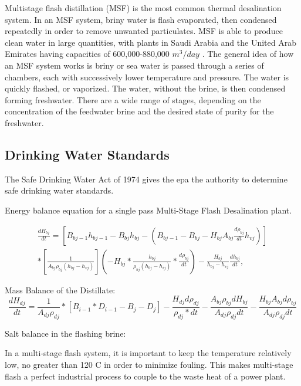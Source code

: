 \documentclass[12pt]{UIdahoMastersThesis}
\begin{document}
Multistage flash distillation (MSF) is the most common thermal desalination system. In an MSF system, briny water is flash evaporated, then condensed repeatedly in order to remove unwanted particulates. MSF is able to produce clean water in large quantities, with plants in Saudi Arabia and the United Arab Emirates having capacities of 600,000-880,000 $m^3/day$ \cite{El-Dessouky2016}. The general idea of how an MSF system works is briny or sea water is passed through a series of chambers, each with successively lower temperature and pressure.  The water is quickly flashed, or vaporized.  The water, without the brine, is then condensed forming freshwater.  There are a wide range of stages, depending on the concentration of the feedwater brine and the desired state of purity for the freshwater.


\subsection{Drinking Water Standards}
The Safe Drinking Water Act of 1974 gives the \ac{epa} the authority to determine safe drinking water standards.

Energy balance equation for a single pass Multi-Stage Flash Desalination plant.

\begin{equation*}
\begin{aligned}
\frac{dH_{bj}}{dt}=[B_{bj-1}h_{bj-1}-B_{bj}h_{bj}-(B_{bj-1}-B_{bj}-H_{bj}A_{bj}\frac{d\rho_{bj}}{dt}h_{vj})]\\
*[\frac{1}{A_{bj}\rho_{bj}(h_{bj}-h_{vj})}] (-H_{bj}*\frac{h_{bj}}{\rho_{bj}(h_{bj}-h_{ij})}*\frac{d\rho_{bj}}{dt})-\frac{H_{bj}}{h_{bj}-h_{vj}}\frac{dh_{bj}}{dt},
\end{aligned}
\end{equation*}

Mass Balance of the Distillate:
\begin{equation*}
\frac{dH_{dj}}{dt}=\frac{1}{A_{dj}{\rho_{dj}}}*[B_{i-1}*D_{i-1}-B_j-D_j]-\frac{H_{dj}d\rho_{dj}}{\rho_{dj}*dt}-\frac{A_{bj}\rho_{bj}dH_{bj}}{A_{dj}\rho_{dj}dt}-\frac{H_{bj}A_{bj}d\rho_{bj}}{A_{dj}\rho_{dj}dt}
\end{equation*}

Salt balance in the flashing brine:

In a multi-stage flash system, it is important to keep the temperature relatively low, no greater than 120 \degree C in order to minimize fouling. This makes multi-stage flash a perfect industrial process to couple to the waste heat of a power plant.
\end{document}
